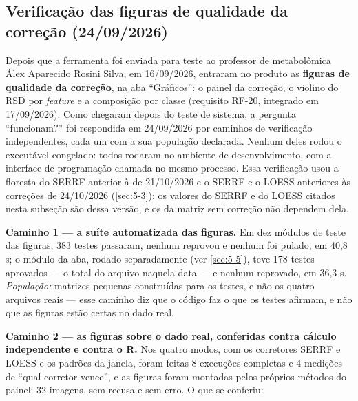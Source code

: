 
\subsection{Verificação das figuras de qualidade da correção (24/09/2026)}\label{sec:5-2-5}

Depois que a ferramenta foi enviada para teste ao professor de metabolômica Álex Aparecido Rosini Silva, em 16/09/2026, entraram no produto as \textbf{figuras de qualidade da correção}, na aba ``Gráficos'': o painel da correção, o violino do RSD por \textit{feature} e a composição por classe (requisito RF-20, integrado em 17/09/2026). Como chegaram depois do teste de sistema, a pergunta ``funcionam?'' foi respondida em 24/09/2026 por caminhos de verificação independentes, cada um com a sua população declarada. Nenhum deles rodou o executável congelado: todos rodaram no ambiente de desenvolvimento, com a interface de programação chamada no mesmo processo. Essa verificação usou a floresta do SERRF anterior à de 21/10/2026 e o SERRF e o LOESS anteriores às correções de 24/10/2026 (\ref{sec:5-3}): os valores do SERRF e do LOESS citados nesta subseção são dessa versão, e os da matriz sem correção não dependem dela.


\textbf{Caminho 1 --- a suíte automatizada das figuras.} Em dez módulos de teste das figuras, 383 testes passaram, nenhum reprovou e nenhum foi pulado, em 40,8 s; o módulo da aba, rodado separadamente (ver \ref{sec:5-5}), teve 178 testes aprovados --- o total do arquivo naquela data --- e nenhum reprovado, em 36,3 s. \textit{População:} matrizes pequenas construídas para os testes, e não os quatro arquivos reais --- esse caminho diz que o código faz o que os testes afirmam, e não que as figuras estão certas no dado real.

\textbf{Caminho 2 --- as figuras sobre o dado real, conferidas contra cálculo independente e contra o R.} Nos quatro modos, com os corretores SERRF e LOESS e os padrões da janela, foram feitas 8 execuções completas e 4 medições de ``qual corretor vence'', e as figuras foram montadas pelos próprios métodos do painel: 32 imagens, sem recusa e sem erro. O que se conferiu:

